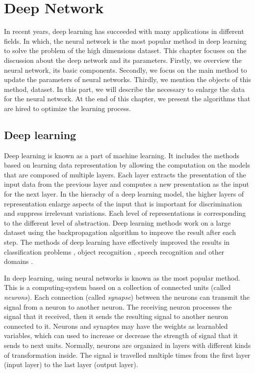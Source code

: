 \chapter{Deep Network}

In recent years, deep learning has succeeded with many applications in different fields. In which, the neural network is the most popular method in deep learning to solve the problem of the high dimensions dataset. This chapter focuses on the discussion about the deep network and its parameters. Firstly, we overview the neural network, its basic components. Secondly, we focus on the main method to update the parameters of neural networks. Thirdly, we mention the objects of this method, dataset. In this part, we will describe the necessary to enlarge the data for the neural network. At the end of this chapter, we present the algorithms that are hired to optimize the learning process.

\section{Deep learning}
Deep learning is known as a part of machine learning. It includes the methods based on learning data representation by allowing the computation on the models that are composed of multiple layers. Each layer extracts the presentation of the input data from the previous layer and computes a new presentation as the input for the next layer. In the hierachy of a deep learning model, the higher layers of representation enlarge aspects of the input that is important for discrimination and suppress irrelevant variations. Each level of representations is corresponding to the different level of abstraction. Deep learning methods work on a large dataset using the backpropagation algorithm to improve the result after each step. The methods of deep learning have effectively improved the results in classification problems \cite{}, object recognition \cite{}, speech recognition \cite{} and other domains \cite{}. 

In deep learning, using neural networks is known as the most popular method. This is a computing-system based on a collection of connected units (called \textit{neurons}). Each connection (called \textit{synapse}) between the neurons can transmit the signal from a neuron to another neuron. The receiving neuron processes the signal that it received, then it sends the resulting signal to another neuron connected to it. Neurons and synaptes may have the weights as learnabled variables, which can used to increase or decrease the strength of signal that it sends to next units. Normally, neurons are organized in layers with different kinds of transformation inside. The signal is travelled multiple times from the first layer (input layer) to the last layer (output layer).

